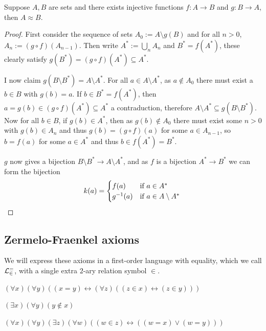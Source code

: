 \documentclass{article}
\begin{document}
\begin{theorem}
    Suppose $A,B$ are sets and there exists injective functions $f:A\rightarrow B$ and $g:B\rightarrow A$, then $A\approx B$.\begin{proof}
        First consider the sequence of sets $A_0 := A\setminus g(B)$ and for all $n>0$, $A_n:= (g\circ f)(A_{n-1})$. Then write $A^* := \bigcup_n A_n$ and $B^* = f(A^*)$, these clearly satisfy $g(B^*) = (g\circ f)(A^*)\subseteq A^*$.

        I now claim $g(B\setminus B^*) = A\setminus A^*$. For all $a\in A\setminus A^*$, as $a\not\in A_0$ there must exist a $b\in B$ with $g(b)=a$. If $b\in B^*=f(A^*)$, then $a = g(b)\in (g\circ f)(A^*)\subseteq A^*$ a contraduction, therefore $A\setminus A^*\subseteq g(B\setminus B^*)$. Now for all $b\in B$, if $g(b)\in A^*$, then as $g(b)\not\in A_0$ there must exist some $n>0$ with $g(b)\in A_n$ and thus $g(b) = (g\circ f)(a)$ for some $a\in A_{n-1}$, so $b = f(a)$ for some $a\in A^*$ and thus $b\in f(A^*) = B^*$.

        $g$ now gives a bijection $B\setminus B^*\rightarrow A\setminus A^*$, and as $f$ is a bijection $A^*\rightarrow B^*$ we can form the bijection \[
        k(a) = \begin{cases}
            f(a) & \text{if $a\in A^*$} \\
            g^{-1}(a) & \text{if $a\in A\setminus A^*$}
        \end{cases}\qedhere
        \]
    \end{proof}
\end{theorem}

\subsection{Zermelo-Fraenkel axioms}

We will express these axioms in a first-order language with equality, which we call $\mathcal{L}_\in^=$, with a single extra $2$-ary relation symbol $\in$.

\begin{axiom}[Extensionality]
    $(\forall x)(\forall y)((x=y) \leftrightarrow (\forall z)((z\in x) \leftrightarrow (z\in y)))$
\end{axiom}

\begin{axiom}
    $(\exists x)(\forall y)(y\not\in x)$
\end{axiom}

\begin{axiom}[Pairing]
    $(\forall x)(\forall y)(\exists z)(\forall w)((w\in z)\leftrightarrow ((w = x) \vee (w = y)))$
\end{axiom}
\end{document}
